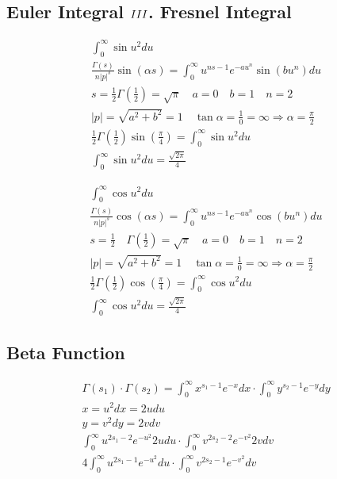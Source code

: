 	\subsection{Euler Integral $\RNumb{3}$. Fresnel Integral}
	$$
	\begin{gathered}
		\int_0^{\infty} \sin u^2 d u \\
		\frac{\Gamma(s)}{n|p|^s} \sin (\alpha s)=\int_0^{\infty} u^{n s-1} e^{-a u^n} \sin \left(b u^n\right) d u \\
		s=\frac{1}{2} \Gamma\left(\frac{1}{2}\right)=\sqrt{\pi} \quad a=0 \quad b=1 \quad n=2 \\
		|p|=\sqrt{a^2+b^2}=1 \quad \tan \alpha=\frac{1}{0}=\infty \Rightarrow \alpha=\frac{\pi}{2} \\
		\frac{1}{2} \Gamma\left(\frac{1}{2}\right) \sin \left(\frac{\pi}{4}\right)=\int_0^{\infty} \sin u^2 d u \\
		\int_0^{\infty} \sin u^2 d u=\frac{\sqrt{2 \pi}}{4}
	\end{gathered}
	$$
	
	$$
	\begin{gathered}
		\int_0^{\infty} \cos u^2 d u \\
		\frac{\Gamma(s)}{n|p|^s} \cos (\alpha s)=\int_0^{\infty} u^{n s-1} e^{-a u^n} \cos \left(b u^n\right) d u \\
		s=\frac{1}{2} \quad \Gamma\left(\frac{1}{2}\right)=\sqrt{\pi} \quad a=0 \quad b=1 \quad n=2 \\
		|p|=\sqrt{a^2+b^2}=1 \quad \tan \alpha=\frac{1}{0}=\infty \Rightarrow \alpha=\frac{\pi}{2} \\
		\frac{1}{2} \Gamma\left(\frac{1}{2}\right) \cos \left(\frac{\pi}{4}\right)=\int_0^{\infty} \cos u^2 d u \\
		\int_0^{\infty} \cos u^2 d u=\frac{\sqrt{2 \pi}}{4}
	\end{gathered}
	$$
	
	\subsection{Beta Function}
	
	$$
	\begin{gathered}
		\Gamma\left(s_1\right) \cdot \Gamma\left(s_2\right)=\int_0^{\infty} x^{s_1-1} e^{-x} d x \cdot \int_0^{\infty} y^{s_2-1} e^{-y} d y \\
		x=u^2 d x=2 u d u \\
		y=v^2 d y=2 v d v \\
		\int_0^{\infty} u^{2 s_1-2} e^{-u^2} 2 u d u \cdot \int_0^{\infty} v^{2 s_2-2} e^{-v^2} 2 v d v \\
		4 \int_0^{\infty} u^{2 s_1-1} e^{-u^2} d u \cdot \int_0^{\infty} v^{2 s_2-1} e^{-v^2} d v
	\end{gathered}
	$$
	
